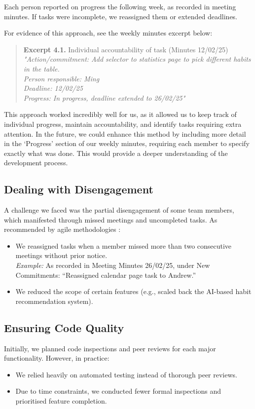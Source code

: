 Each person reported on progress the following week, as recorded in meeting minutes. If tasks were incomplete, we reassigned them or extended deadlines.

For evidence of this approach, see the weekly minutes excerpt below:

\begin{quote}
\textbf{Excerpt 4.1.} Individual accountability of task (Minutes 12/02/25)\\
\textit{"Action/commitment: Add selector to statistics page to pick different habits in the table.\\
Person responsible: Ming\\
Deadline: 12/02/25\\
Progress: In progress, deadline extended to 26/02/25"}
\end{quote}

This approach worked incredibly well for us, as it allowed us to keep track of individual progress, maintain accountability, and identify tasks requiring extra attention. In the future, we could enhance this method by including more detail in the ‘Progress’ section of our weekly minutes, requiring each member to specify exactly what was done. This would provide a deeper understanding of the development process.

\subsection{Dealing with Disengagement}
A challenge we faced was the partial disengagement of some team members, which manifested through missed meetings and uncompleted tasks. As recommended by agile methodologies \cite{schwaber2020scrum}:
\begin{itemize}
    \item We reassigned tasks when a member missed more than two consecutive meetings without prior notice.\\
    \textit{Example:} As recorded in Meeting Minutes 26/02/25, under New Commitments: “Reassigned calendar page task to Andrew.”
    \item We reduced the scope of certain features (e.g., scaled back the AI-based habit recommendation system).
\end{itemize}

\subsection{Ensuring Code Quality}
Initially, we planned code inspections and peer reviews for each major functionality. However, in practice:
\begin{itemize}
    \item We relied heavily on automated testing instead of thorough peer reviews.
    \item Due to time constraints, we conducted fewer formal inspections and prioritised feature completion.
\end{itemize}

